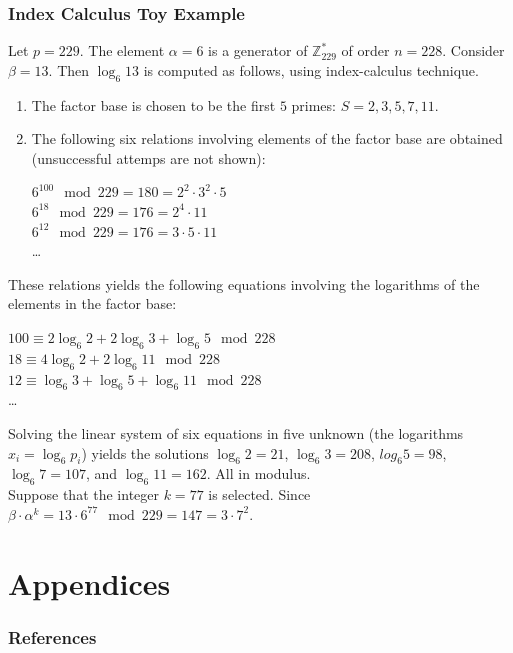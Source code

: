 \documentclass[hyperref=true]{beamer}
\begin{document}
\begin{frame}[allowframebreaks]
  \frametitle{Index Calculus Toy Example}
Let $p=229$. The element $\alpha=6$ is a generator of
$\mathbb{Z}_{229}^{*}$ of order $n=228$. Consider $\beta=13$. Then
$\log_{6}13$ is computed as follows, using index-calculus technique.
\begin{enumerate}
\item The factor base is chosen to be the first $5$ primes:
  $S={2,3,5,7,11}$.
\item The following six relations involving elements of the factor
  base are obtained (unsuccessful attemps are not shown):


\begin{center}
$6^{100}\mod 229  = 180 = 2^{2}\cdot 3^{2}\cdot 5$\\
$ 6^{18}\mod 229  = 176 = 2^{4}\cdot 11$\\
$6^{12}\mod 229=176=3\cdot 5\cdot 11$\\
\ldots
\end{center}
\end{enumerate}
\end{frame}


\begin{frame}
These relations yields the following equations involving the
  logarithms of the elements in the factor base:
\begin{center}
$100\equiv 2\log_{6}2+2\log_{6}3+\log_{6}5\mod 228$\\
$18\equiv 4\log_{6}2+2\log_{6}11\mod 228$\\
$12\equiv \log_{6}3+\log_{6}5+\log_{6}11\mod 228$\\
\ldots
\end{center}
Solving the linear system of six equations in five unknown (the
logarithms $x_{i}=\log_{6}p_{i}$) yields the solutions
$\log_{6}2=21$, $\log_{6}3=208$, $log_{6}5=98$, $\log_{6}7=107$, and
$\log_{6}11=162$. All in modulus.\\[4pt]
Suppose that the integer $k=77$ is selected. Since
$\beta\cdot\alpha^{k}=13\cdot6^{77}\mod 229=147=3\cdot 7^{2}$.
\end{frame}




\section{Appendices}


\begin{frame}[allowframebreaks]
  \frametitle{References}



\end{frame}
\end{document}
